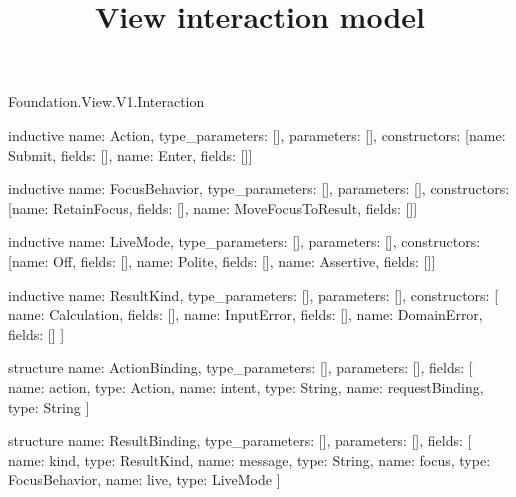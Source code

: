 \begin{lexlean}{Foundation.View.V1.Interaction}
\title{View interaction model}
\begin{semanticmodule}
inductive{
  name: Action,
  type_parameters: [],
  parameters: [],
  constructors: [{name: Submit, fields: []}, {name: Enter, fields: []}]
}

inductive{
  name: FocusBehavior,
  type_parameters: [],
  parameters: [],
  constructors: [{name: RetainFocus, fields: []}, {name: MoveFocusToResult, fields: []}]
}

inductive{
  name: LiveMode,
  type_parameters: [],
  parameters: [],
  constructors: [{name: Off, fields: []}, {name: Polite, fields: []}, {name: Assertive, fields: []}]
}

inductive{
  name: ResultKind,
  type_parameters: [],
  parameters: [],
  constructors: [
    {name: Calculation, fields: []},
    {name: InputError, fields: []},
    {name: DomainError, fields: []}
  ]
}

structure{
  name: ActionBinding,
  type_parameters: [],
  parameters: [],
  fields: [
    {name: action, type: Action},
    {name: intent, type: String},
    {name: requestBinding, type: String}
  ]
}

structure{
  name: ResultBinding,
  type_parameters: [],
  parameters: [],
  fields: [
    {name: kind, type: ResultKind},
    {name: message, type: String},
    {name: focus, type: FocusBehavior},
    {name: live, type: LiveMode}
  ]
}
\end{semanticmodule}
\end{lexlean}
